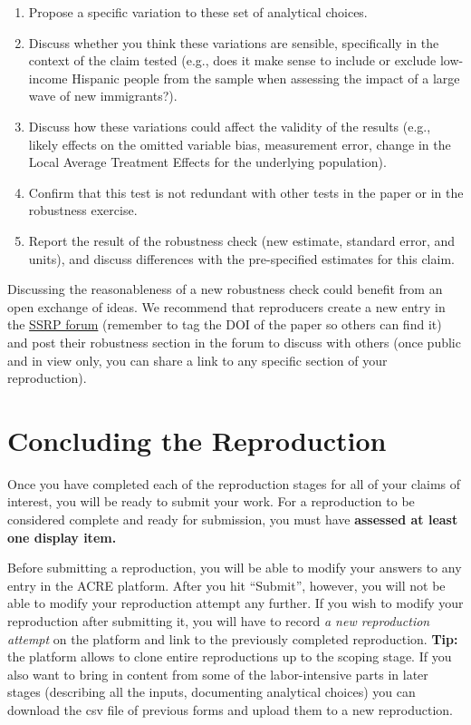 \documentclass[
  openany]{book}
\begin{document}
\begin{enumerate}
\def\labelenumi{\arabic{enumi}.}
\setcounter{enumi}{1}
\item
  Propose a specific variation to these set of analytical choices.
\item
  Discuss whether you think these variations are sensible, specifically in the context of the claim tested (e.g., does it make sense to include or exclude low-income Hispanic people from the sample when assessing the impact of a large wave of new immigrants?).
\item
  Discuss how these variations could affect the validity of the results (e.g., likely effects on the omitted variable bias, measurement error, change in the Local Average Treatment Effects for the underlying population).
\item
  Confirm that this test is not redundant with other tests in the paper or in the robustness exercise.
\item
  Report the result of the robustness check (new estimate, standard error, and units), and discuss differences with the pre-specified estimates for this claim.
\end{enumerate}

Discussing the reasonableness of a new robustness check could benefit from an open exchange of ideas. We recommend that reproducers create a new entry in the \href{https://forum.socialsciencereproduction.org/}{SSRP forum} (remember to tag the DOI of the paper so others can find it) and post their robustness section in the forum to discuss with others (once public and in view only, you can share a link to any specific section of your reproduction).

\hypertarget{concluding-the-reproduction}{%
\chapter{Concluding the Reproduction}\label{concluding-the-reproduction}}

Once you have completed each of the reproduction stages for all of your claims of interest, you will be ready to submit your work. For a reproduction to be considered complete and ready for submission, you must have \textbf{assessed at least one display item.}

Before submitting a reproduction, you will be able to modify your answers to any entry in the ACRE platform. After you hit ``Submit'', however, you will not be able to modify your reproduction attempt any further. If you wish to modify your reproduction after submitting it, you will have to record \emph{a new reproduction attempt} on the platform and link to the previously completed reproduction. \textbf{Tip:} the platform allows to clone entire reproductions up to the scoping stage. If you also want to bring in content from some of the labor-intensive parts in later stages (describing all the inputs, documenting analytical choices) you can download the csv file of previous forms and upload them to a new reproduction.
\end{document}
